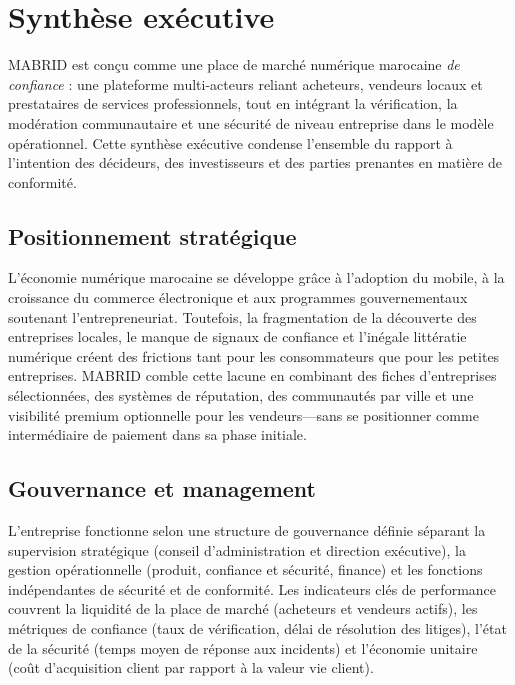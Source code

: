 \chapter*{Synthèse exécutive}

MABRID est conçu comme une place de marché numérique marocaine \emph{de confiance} : une plateforme multi-acteurs reliant acheteurs, vendeurs locaux et prestataires de services professionnels, tout en intégrant la vérification, la modération communautaire et une sécurité de niveau entreprise dans le modèle opérationnel. Cette synthèse exécutive condense l'ensemble du rapport à l'intention des décideurs, des investisseurs et des parties prenantes en matière de conformité.

\section*{Positionnement stratégique}

L'économie numérique marocaine se développe grâce à l'adoption du mobile, à la croissance du commerce électronique et aux programmes gouvernementaux soutenant l'entrepreneuriat. Toutefois, la fragmentation de la découverte des entreprises locales, le manque de signaux de confiance et l'inégale littératie numérique créent des frictions tant pour les consommateurs que pour les petites entreprises. MABRID comble cette lacune en combinant des fiches d'entreprises sélectionnées, des systèmes de réputation, des communautés par ville et une visibilité premium optionnelle pour les vendeurs---sans se positionner comme intermédiaire de paiement dans sa phase initiale.

\section*{Gouvernance et management}

L'entreprise fonctionne selon une structure de gouvernance définie séparant la supervision stratégique (conseil d'administration et direction exécutive), la gestion opérationnelle (produit, confiance et sécurité, finance) et les fonctions indépendantes de sécurité et de conformité. Les indicateurs clés de performance couvrent la liquidité de la place de marché (acheteurs et vendeurs actifs), les métriques de confiance (taux de vérification, délai de résolution des litiges), l'état de la sécurité (temps moyen de réponse aux incidents) et l'économie unitaire (coût d'acquisition client par rapport à la valeur vie client).

